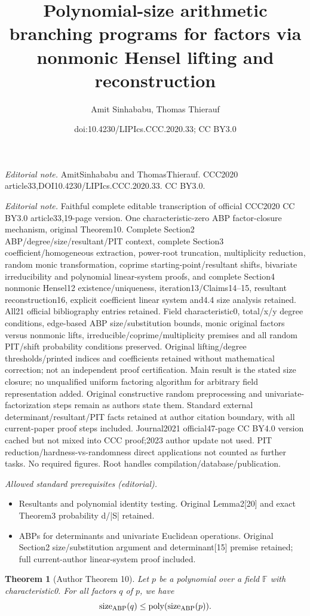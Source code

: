 \documentclass[10pt,a4paper]{article}
\title{Polynomial-size arithmetic branching programs for factors via nonmonic Hensel lifting and reconstruction}
\author{Amit Sinhababu, Thomas Thierauf}
\date{doi:10.4230/LIPIcs.CCC.2020.33; CC BY3.0}
\newtheorem{nttheorem}{Theorem}
\newcommand{\sz}{\operatorname{size}_{\rm ABP}}
\begin{document}
\maketitle
\noindent\textit{Editorial note.} AmitSinhababu and ThomasThierauf. CCC2020 article33,DOI10.4230/LIPIcs.CCC.2020.33. CC BY3.0.\par\medskip
\noindent\textit{Editorial note.} Faithful complete editable transcription of official CCC2020 CC BY3.0 article33,19-page version. One characteristic-zero ABP factor-closure mechanism, original Theorem10. Complete Section2 ABP/degree/size/resultant/PIT context, complete Section3 coefficient/homogeneous extraction, power-root truncation, multiplicity reduction, random monic transformation, coprime starting-point/resultant shifts, bivariate irreducibility and polynomial linear-system proofs, and complete Section4 nonmonic Hensel12 existence/uniqueness, iteration13/Claims14--15, resultant reconstruction16, explicit coefficient linear system and4.4 size analysis retained. All21 official bibliography entries retained. Field characteristic0, total/x/y degree conditions, edge-based ABP size/substitution bounds, monic original factors versus nonmonic lifts, irreducible/coprime/multiplicity premises and all random PIT/shift probability conditions preserved. Original lifting/degree thresholds/printed indices and coefficients retained without mathematical correction; not an independent proof certification. Main result is the stated size closure; no unqualified uniform factoring algorithm for arbitrary field representation added. Original constructive random preprocessing and univariate-factorization steps remain as authors state them. Standard external determinant/resultant/PIT facts retained at author citation boundary, with all current-paper proof steps included. Journal2021 official47-page CC BY4.0 version cached but not mixed into CCC proof;2023 author update not used. PIT reduction/hardness-vs-randomness direct applications not counted as further tasks. No required figures. Root handles compilation/database/publication.\par\medskip
\noindent\textit{Allowed standard prerequisites (editorial).}\begin{itemize}
\item Resultants and polynomial identity testing. Original Lemma2[20] and exact Theorem3 probability d/|S| retained.
\item ABPs for determinants and univariate Euclidean operations. Original Section2 size/substitution argument and determinant[15] premise retained; full current-author linear-system proof included.
\end{itemize}\medskip
\setcounter{nttheorem}{9}
\begin{nttheorem}[Author Theorem 10]
Let $p$ be a polynomial over a field $\mathbb F$ with characteristic0. For all factors $q$ of $p$, we have
\[\sz(q)\leq\operatorname{poly}(\sz(p)).\]
\end{nttheorem}
\end{document}
